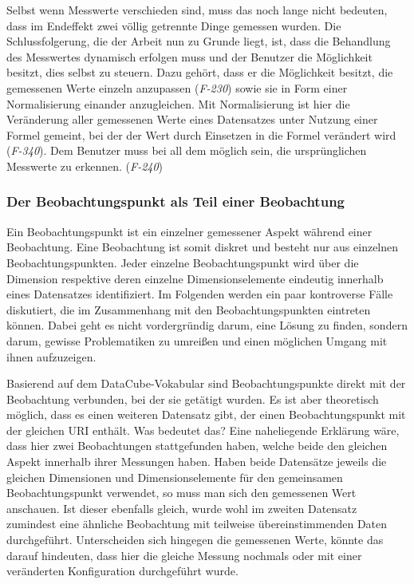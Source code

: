 \documentclass[11pt]{article}
\newcommand{\com}[1]{\marginpar{\em {\small{#1}}}} %
\begin{document}
%
%
\label{req:F230source}
\label{req:F240source}
\label{req:F340source} 
Selbst wenn Messwerte verschieden sind, muss das noch lange nicht bedeuten, dass im Endeffekt zwei völlig getrennte Dinge gemessen wurden. Die Schlussfolgerung, die der Arbeit nun zu Grunde liegt, ist, dass die Behandlung des Messwertes dynamisch erfolgen muss und der Benutzer\com{Anforderungen \\\\ \mbox{F-230, S. \pageref{req:F230}} \\\\ \mbox{F-340, S. \pageref{req:F340}} \\ \mbox{F-240, S. \pageref{req:F240}}} die Möglichkeit besitzt, dies selbst zu steuern. Dazu gehört, dass er die Möglichkeit besitzt, die gemessenen Werte einzeln anzupassen (\textit{F-230}) sowie sie in Form einer Normalisierung einander anzugleichen. Mit Normalisierung ist hier die Veränderung aller gemessenen Werte eines Datensatzes unter Nutzung einer Formel gemeint, bei der der Wert durch Einsetzen in die Formel verändert wird (\textit{F-340}). Dem Benutzer muss bei all dem möglich sein, die ursprünglichen Messwerte zu erkennen. (\textit{F-240})


%
% 
\subsubsection{Der Beobachtungspunkt als Teil einer Beobachtung}

Ein Beobachtungspunkt ist ein einzelner gemessener Aspekt während einer Beobachtung. Eine Beobachtung ist somit diskret und besteht nur aus einzelnen Beobachtungspunkten. Jeder einzelne Beobachtungspunkt wird über die Dimension respektive deren einzelne Dimensionselemente eindeutig innerhalb eines Datensatzes identifiziert. Im Folgenden werden ein paar kontroverse Fälle diskutiert, die im Zusammenhang mit den Beobachtungspunkten eintreten können. Dabei geht es nicht vordergründig darum, eine Lösung zu finden, sondern darum, gewisse Problematiken zu umreißen und einen möglichen Umgang mit ihnen aufzuzeigen.

Basierend auf dem DataCube-Vokabular sind Beobachtungspunkte direkt mit der Beobachtung verbunden, bei der sie getätigt wurden. Es ist aber theoretisch möglich, dass es einen weiteren Datensatz gibt, der einen Beobachtungspunkt mit der gleichen URI enthält. Was bedeutet das? Eine naheliegende Erklärung wäre, dass hier zwei \mbox{Beobachtungen} stattgefunden haben, welche beide den gleichen Aspekt innerhalb ihrer Messungen haben. Haben beide Datensätze jeweils die gleichen Dimensionen und Dimensionselemente für den gemeinsamen Beobachtungspunkt verwendet, so muss man sich den gemessenen Wert anschauen. Ist dieser ebenfalls gleich, wurde wohl im zweiten Datensatz zumindest eine ähnliche Beobachtung mit teilweise übereinstimmenden Daten durchgeführt. Unterscheiden sich hingegen die gemessenen Werte, könnte das darauf hindeuten, dass hier die gleiche Messung nochmals oder mit einer veränderten Konfiguration durchgeführt wurde.
\end{document}
